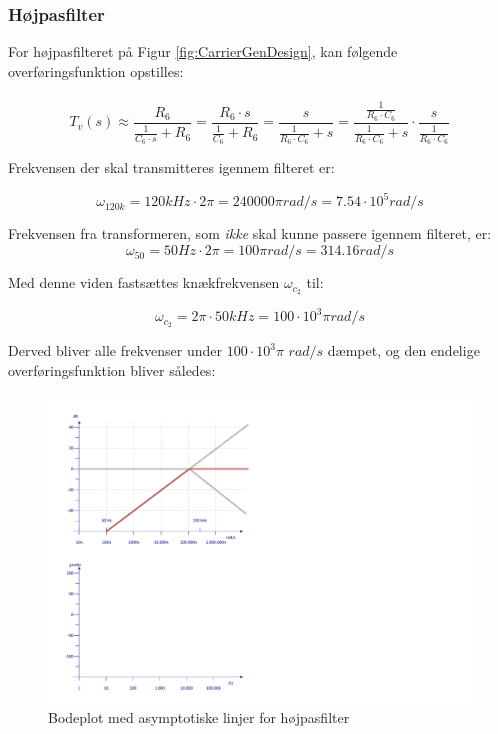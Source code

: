 \subsubsection{Højpasfilter}

For højpasfilteret på Figur \ref{fig:CarrierGenDesign}, kan følgende overføringsfunktion opstilles:\\\\
\begin{displaymath}
T_{v}(s)\approx
\dfrac{R_{6}}{\tfrac{1}{C_{6}\cdot s}+R_{6}}=
\dfrac{R_{6} \cdot s}{\tfrac{1}{C_{6}} + R_{6} }=
\dfrac{s}{ \tfrac{1}{R_{6} \cdot C_{6}}+s }=
\dfrac{\tfrac{1}{R_{6}\cdot C_{6}}}{\tfrac{1}{R_{6}\cdot C_{6}}+s} \cdot \dfrac{s}{\tfrac{1}{R_{6}\cdot C_{6}}}
\end{displaymath}

Frekvensen der skal transmitteres igennem filteret er:

\begin{displaymath}
\omega_{120k} = 120kHz\cdot 2 \pi = 240000 \pi rad/s = 7.54\cdot 10^{5} rad/s
\end{displaymath}

Frekvensen fra transformeren, som \textit{ikke} skal kunne passere igennem filteret, er:
\begin{displaymath}
\omega_{50} = 50Hz\cdot 2 \pi = 100 \pi rad/s = 314.16 rad/s
\end{displaymath}

Med denne viden fastsættes knækfrekvensen $\omega_{c_{2}}$ til:

\begin{displaymath}
\omega_{c_{2}}= 2\pi \cdot 50kHz = 100\cdot 10^{3}\pi rad/s
\end{displaymath}

Derved bliver alle frekvenser under $100\cdot 10^{3}\pi$ $rad/s$ dæmpet, og den endelige overføringsfunktion bliver således:

\begin{figure}[h]
	\centering
	\includegraphics[scale=0.5, trim=50 420 560 50, clip=true]{../HardwareDesign/Diagrammer/BodePlotHPF.pdf}
	\caption{Bodeplot med asymptotiske linjer for højpasfilter}
	\label{fig:BodeHPF}
\end{figure}

